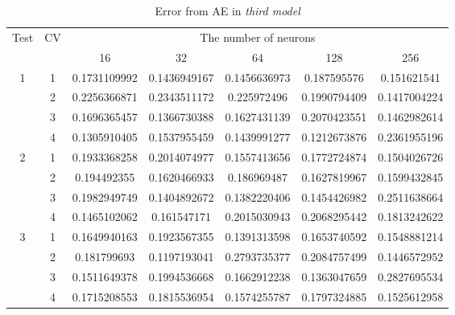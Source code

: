 \documentclass[draft,dvipsnames]{drexel-thesis}
\begin{document}
\begin{thesis}
\begin{table}[!t]
\centering
\caption{Error from AE in {\em third model}}
\label{tbl:mae_error}
\begin{tabular}{|c|c|c|c|c|c|c|}
\hline
\multirow{2}{*}{Test} & \multirow{2}{*}{CV} & \multicolumn{5}{c|}{The number of neurons}                                   \\ \cline{3-7} 
                      &                     & 16           & 32            & 64            & 128           & 256           \\ \hline
\multirow{4}{*}{1}    & 1                   & 0.1731109992 & 0.1436949167  & 0.1456636973  & 0.187595576   & 0.151621541   \\ \cline{2-7} 
                      & 2                   & 0.2256366871 & 0.2343511172  & 0.225972496   & 0.1990794409  & 0.1417004224  \\ \cline{2-7} 
                      & 3                   & 0.1696365457 & 0.1366730388  & 0.1627431139  & 0.2070423551  & 0.1462982614  \\ \cline{2-7} 
                      & 4                   & 0.1305910405 & 0.1537955459  & 0.1439991277  & 0.1212673876  & 0.2361955196  \\ \hline
\multirow{4}{*}{2}    & 1                   & 0.1933368258 & 0.2014074977  & 0.1557413656  & 0.1772724874  & 0.1504026726  \\ \cline{2-7} 
                      & 2                   & 0.194492355  & 0.1620466933  & 0.186969487   & 0.1627819967  & 0.1599432845  \\ \cline{2-7} 
                      & 3                   & 0.1982949749 & 0.1404892672  & 0.1382220406  & 0.1454426982  & 0.2511638664  \\ \cline{2-7} 
                      & 4                   & 0.1465102062 & 0.161547171   & 0.2015030943  & 0.2068295442  & 0.1813242622  \\ \hline
\multirow{4}{*}{3}    & 1                   & 0.1649940163 & 0.1923567355  & 0.1391313598  & 0.1653740592  & 0.1548881214  \\ \cline{2-7} 
                      & 2                   & 0.181799693  & 0.1197193041  & 0.2793735377  & 0.2084757499  & 0.1446572952  \\ \cline{2-7} 
                      & 3                   & 0.1511649378 & 0.1994536668  & 0.1662912238  & 0.1363047659  & 0.2827695534  \\ \cline{2-7} 
                      & 4                   & 0.1715208553 & 0.1815536954  & 0.1574255787  & 0.1797324885  & 0.1525612958  \\ \hline

\end{tabular}
\end{table}
\end{thesis}
\end{document}
